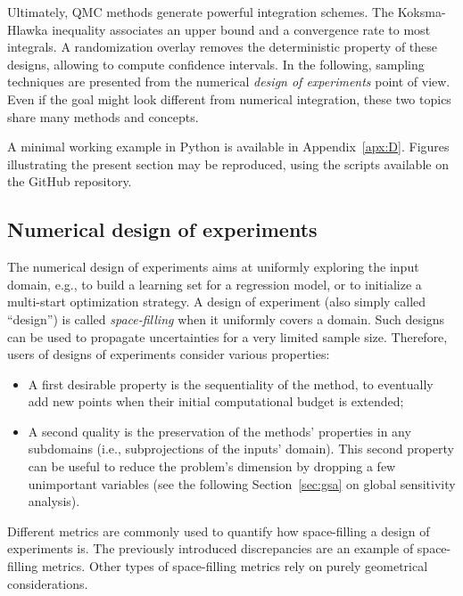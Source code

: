 Ultimately, QMC methods generate powerful integration schemes. 
The Koksma-Hlawka inequality associates an upper bound and a convergence rate to most integrals. 
A randomization overlay removes the deterministic property of these designs, allowing to compute confidence intervals. 
In the following, sampling techniques are presented from the numerical \textit{design of experiments} point of view. 
Even if the goal might look different from numerical integration, these two topics share many methods and concepts. 


\begin{otexample}
    A minimal working example in Python is available in Appendix~\ref{apx:D}. 
    Figures illustrating the present section may be reproduced, using the \ots scripts available on the GitHub repository\footnotemark.  
\end{otexample}

\subsection{Numerical design of experiments} \label{sec:LHS}
The numerical design of experiments aims at uniformly exploring the input domain, e.g., to build a learning set for a regression model, or to initialize a multi-start optimization strategy. 
A design of experiment (also simply called ``design'') is called \textit{space-filling} when it uniformly covers a domain. 
Such designs can be used to propagate uncertainties for a very limited sample size. 
Therefore, users of designs of experiments consider various properties: 
\begin{itemize}
    \item A first desirable property is the sequentiality of the method, to eventually add new points when their initial computational budget is extended; 
    \item A second quality is the preservation of the methods' properties in any subdomains (i.e., subprojections of the inputs’ domain). 
    This second property can be useful to reduce the problem's dimension by dropping a few unimportant variables (see the following Section~\ref{sec:gsa} on global sensitivity analysis).
\end{itemize}
Different metrics are commonly used to quantify how space-filling a design of experiments is. 
The previously introduced discrepancies are an example of space-filling metrics. 
Other types of space-filling metrics rely on purely geometrical considerations.  

